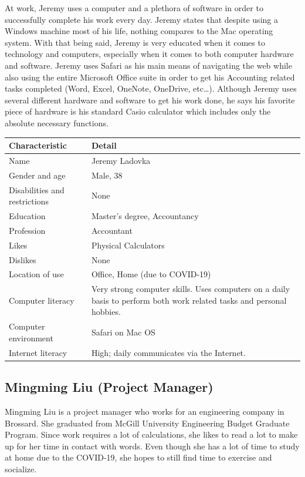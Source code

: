 \documentclass[11pt,onside]{report}
\begin{document}
At work, Jeremy uses a computer and a plethora of software in order to successfully complete his work every day. Jeremy states that despite using a Windows machine most of his life, nothing compares to the Mac operating system. With that being said, Jeremy is very educated when it comes to technology and computers, especially when it comes to both computer hardware and software. Jeremy uses Safari as his main means of navigating the web while also using the entire Microsoft Office suite in order to get his Accounting related tasks completed (Word, Excel, OneNote, OneDrive, etc…). Although Jeremy uses several different hardware and software to get his work done, he says his favorite piece of hardware is his standard Casio calculator which includes only the absolute necessary functions.
\begin{center}
    \begin{tabular}{|p{4cm}|p{10cm}|}
        \hline
        \bf{Characteristic} & \bf{Detail} \\
        \hline
        Name &   Jeremy Ladovka \\
        \hline
        Gender and age & Male, 38 \\
        \hline
        Disabilities and restrictions &  None \\
        \hline
        Education & Master's degree, Accountancy \\
        \hline
        Profession & Accountant \\
        \hline
        Likes & Physical Calculators \\
        \hline
        Dislikes & None \\
        \hline
        Location of use & Office, Home (due to COVID-19) \\
        \hline
        Computer literacy & Very strong computer skills. Uses computers on a daily basis to perform both work related tasks and personal hobbies. \\
        \hline
        Computer environment & Safari on Mac OS \\
        \hline
        Internet literacy &  High; daily communicates via the Internet. \\
        \hline
    \end{tabular}
\end{center}

\subsection{Mingming Liu (Project Manager)}
Mingming Liu is a project manager who works for an engineering company in Brossard. She graduated from McGill University Engineering Budget Graduate Program. Since work requires a lot of calculations, she likes to read a lot to make up for her time in contact with words. Even though she has a lot of time to study at home due to the COVID-19, she hopes to still find time to exercise and socialize. \\
\end{document}

